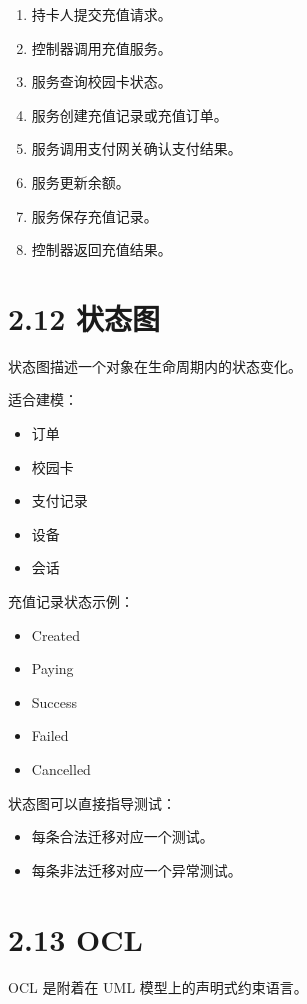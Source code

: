 \documentclass[UTF8,zihao=-4]{ctexart}
\begin{document}
\begin{enumerate}
\item 持卡人提交充值请求。
\item 控制器调用充值服务。
\item 服务查询校园卡状态。
\item 服务创建充值记录或充值订单。
\item 服务调用支付网关确认支付结果。
\item 服务更新余额。
\item 服务保存充值记录。
\item 控制器返回充值结果。
\end{enumerate}

\section{2.12 状态图}

状态图描述一个对象在生命周期内的状态变化。

适合建模：

\begin{itemize}
\item 订单
\item 校园卡
\item 支付记录
\item 设备
\item 会话
\end{itemize}

充值记录状态示例：

\begin{itemize}
\item Created
\item Paying
\item Success
\item Failed
\item Cancelled
\end{itemize}

状态图可以直接指导测试：

\begin{itemize}
\item 每条合法迁移对应一个测试。
\item 每条非法迁移对应一个异常测试。
\end{itemize}

\section{2.13 OCL}

OCL 是附着在 UML 模型上的声明式约束语言。
\end{document}
